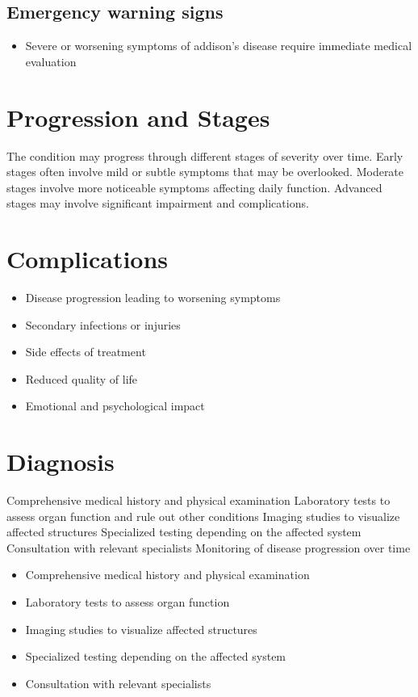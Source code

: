 \subsection{Emergency warning signs}
\begin{itemize}[noitemsep]
  \item Severe or worsening symptoms of addison's disease require immediate medical evaluation
\end{itemize}
\section{Progression and Stages}
The condition may progress through different stages of severity over time. Early stages often involve mild or subtle symptoms that may be overlooked. Moderate stages involve more noticeable symptoms affecting daily function. Advanced stages may involve significant impairment and complications.
\section{Complications}
\begin{itemize}[noitemsep]
  \item Disease progression leading to worsening symptoms
  \item Secondary infections or injuries
  \item Side effects of treatment
  \item Reduced quality of life
  \item Emotional and psychological impact
\end{itemize}
\section{Diagnosis}
Comprehensive medical history and physical examination Laboratory tests to assess organ function and rule out other conditions Imaging studies to visualize affected structures Specialized testing depending on the affected system Consultation with relevant specialists Monitoring of disease progression over time

\begin{itemize}[noitemsep]
  \item Comprehensive medical history and physical examination
  \item Laboratory tests to assess organ function
  \item Imaging studies to visualize affected structures
  \item Specialized testing depending on the affected system
  \item Consultation with relevant specialists
\end{itemize}
